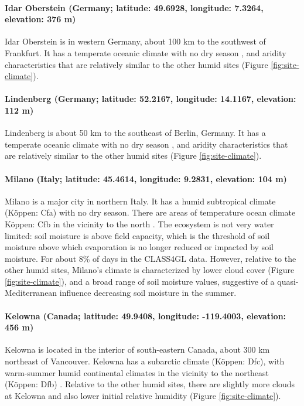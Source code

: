 \paragraph{Idar Oberstein (Germany; latitude: 49.6928, longitude:
  7.3264, elevation: 376 m)} Idar Oberstein is in western Germany,
about 100 km to the southwest of Frankfurt. It has a temperate oceanic
climate with no dry season \cite[K\"{o}ppen: Cfb,][]{rubel2010}, and
aridity characteristics that are relatively similar to the other humid
sites (Figure \ref{fig:site-climate}).

\paragraph{Lindenberg (Germany; latitude: 52.2167, longitude:
  14.1167, elevation: 112 m)}

Lindenberg is about 50 km to the southeast of Berlin, Germany. It has
a temperate oceanic climate with no dry season \cite[(K\"{o}ppen:
  Cfb)][]{rubel2010}, and aridity characteristics that are relatively
similar to the other humid sites (Figure \ref{fig:site-climate}).

\paragraph{Milano (Italy; latitude: 45.4614, longitude: 9.2831, elevation: 104 m)}

Milano is a major city in northern Italy. It has a humid subtropical
climate (K\"{o}ppen: Cfa) with no dry season. There are areas of
temperature ocean climate K\"{o}ppen: Cfb in the vicinity to the north
\cite{rubel2010}. The ecosystem is not very water limited: soil
moisture is above field capacity, which is the threshold of soil
moisture above which evaporation is no longer reduced or impacted by
soil moisture. For about 8\% of days in the CLASS4GL data. However,
relative to the other humid sites, Milano's climate is characterized
by lower cloud cover (Figure \ref{fig:site-climate}), and a broad
range of soil moisture values, suggestive of a quasi-Mediterranean
influence decreasing soil moisture in the summer.

\paragraph{Kelowna (Canada; latitude: 49.9408, longitude: -119.4003,
  elevation: 456 m)}

Kelowna is located in the interior of south-eastern Canada, about
300 km northeast of Vancouver. Kelowna has a subarctic climate
(K\"{o}ppen: Dfc), with warm-summer humid continental climates in the
vicinity to the northeast (K\"{o}ppen: Dfb)
\cite[][]{rubel2010}. Relative to the other humid sites, there are
slightly more clouds at Kelowna and also lower initial relative
humidity (Figure \ref{fig:site-climate}).

